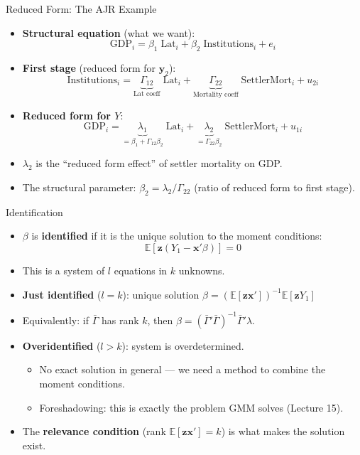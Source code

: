 \documentclass[aspectratio=169, handout]{beamer}
\numberwithin{equation}{section}
\begin{document}
\begin{frame}{Reduced Form: The AJR Example}
\begin{itemize}
\item \textbf{Structural equation} (what we want):
$$\text{GDP}_i = \beta_1\;\text{Lat}_i + \beta_2\;\text{Institutions}_i + e_i$$
\item \textbf{First stage} (reduced form for $\bm{y}_2$):
$$\text{Institutions}_i = \underbrace{\Gamma_{12}}_{\text{Lat coeff}}\;\text{Lat}_i + \underbrace{\Gamma_{22}}_{\text{Mortality coeff}}\;\text{SettlerMort}_i + u_{2i}$$
\item \textbf{Reduced form for $Y$}:
$$\text{GDP}_i = \underbrace{\lambda_1}_{=\beta_1+\Gamma_{12}\beta_2}\;\text{Lat}_i + \underbrace{\lambda_2}_{=\Gamma_{22}\beta_2}\;\text{SettlerMort}_i + u_{1i}$$
\item $\lambda_2$ is the ``reduced form effect'' of settler mortality on GDP.
\item The structural parameter: $\beta_2 = \lambda_2 / \Gamma_{22}$ \quad (ratio of reduced form to first stage).
\end{itemize}
\end{frame}


\begin{frame}{Identification}
\begin{itemize}
\item $\beta$ is \textbf{identified} if it is the unique solution to the moment conditions:
$$\mathbb{E}[\bm{z}(Y_1-\bm{x}'\beta)]=0$$
\item This is a system of $l$ equations in $k$ unknowns.
\item \textbf{Just identified} ($l=k$): unique solution $\beta = (\mathbb{E}[\bm{z}\bm{x}'])^{-1}\mathbb{E}[\bm{z}Y_1]$
\item Equivalently: if $\bar{\Gamma}$ has rank $k$, then $\beta=(\bar{\Gamma}'\bar{\Gamma})^{-1}\bar{\Gamma}'\lambda$.
\item \textbf{Overidentified} ($l>k$): system is overdetermined.
\begin{itemize}
\item No exact solution in general --- we need a method to combine the moment conditions.
\item \alert{Foreshadowing:} this is exactly the problem GMM solves (Lecture 15).
\end{itemize}
\item The \textbf{relevance condition} (rank $\mathbb{E}[\bm{z}\bm{x}']=k$) is what makes the solution exist.
\end{itemize}
\end{frame}
\end{document}
